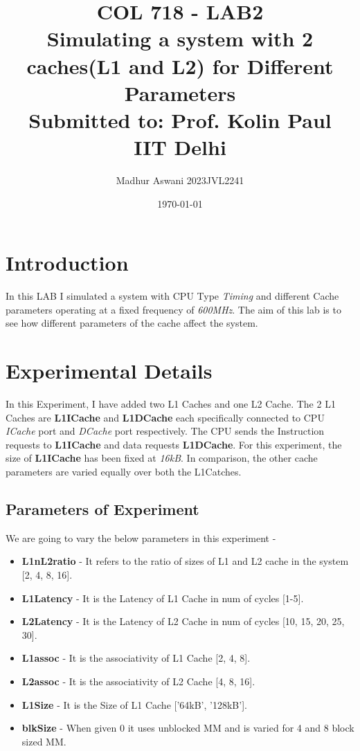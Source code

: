 \documentclass[10pt,a4paper]{article}
\begin{document}
\title{COL 718 - LAB2 \\ \textbf{Simulating a system with 2 caches(L1 and L2) for Different Parameters} \\ Submitted to: Prof. Kolin Paul \\ IIT Delhi}

\author{Madhur Aswani \cr 2023JVL2241}

\date{\today}

\maketitle
\section{Introduction}
In this LAB I simulated a system with CPU Type \emph{Timing} and different Cache parameters operating at a fixed frequency of \emph{600MHz}. The aim of this lab is to see how different parameters of the cache affect the system.
\section{Experimental Details}
In this Experiment, I have added two L1 Caches and one L2 Cache. The 2 L1 Caches are \textbf{L1ICache} and \textbf{L1DCache} each specifically connected to CPU \emph{ICache} port and \emph{DCache} port respectively. The CPU sends the Instruction requests to \textbf{L1ICache} and data requests \textbf{L1DCache}. For this experiment, the size of \textbf{L1ICache} has been fixed at \emph{16kB}. In comparison, the other cache parameters are varied equally over both the L1Catches.
\subsection{Parameters of Experiment}
We are going to vary the below parameters in this experiment -
\begin{itemize} 
\item \textbf{L1nL2ratio} - It refers to the ratio of sizes of L1 and L2 cache in the system [2, 4, 8, 16].
\item \textbf{L1Latency} - It is the Latency of L1 Cache in num of cycles [1-5].
\item \textbf{L2Latency} - It is the Latency of L2 Cache in num of cycles [10, 15, 20, 25, 30].
\item \textbf{L1assoc} - It is the associativity of L1 Cache [2, 4, 8].
\item \textbf{L2assoc} - It is the associativity of L2 Cache [4, 8, 16].
\item \textbf{L1Size} - It is the Size of L1 Cache ['64kB', '128kB'].
\item \textbf{blkSize} - When given 0 it uses unblocked MM and is varied for 4 and 8 block sized MM.
\end{itemize}
\end{document}
